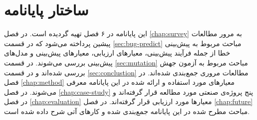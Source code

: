 \section{ساختار پایانامه}

این پایانامه در ۶ فصل تهیه گردیده است. در فصل \ref{chap:survey} به مرور مطالعات پیشین پرداخته می‌شود که در  قسمت \ref{sec:bug-predict}  مباحث مربوط به پیش‌بینی خطا از جمله فرآیند پیش‌بینی، معیارهای ارزیابی، معیارهای پیش‌بینی و مدل‌های پیش‌بینی بررسی می‌شوند. در قسمت \ref{sec:mutation} مباحث مربوط به آزمون جهش بررسی شده‌اند و در قسمت \ref{sec:conclustion} مطالعات مروری جمع‌بندی شده‌اند. در فصل \ref{chap:method} معیارهای مورد استفاده و ارائه شده در این پایانامه معرفی می‌شوند. در فصل \ref{chap:case-study} پنج پروژه‌ی صنعتی مورد مطالعه قرار گرفته‌اند و در فصل \ref{chap:evaluation} معیارها مورد ارزیابی قرار گرفته‌اند. در فصل \ref{chap:future} مباحث مطرح شده در این پایانامه جمع‌بندی شده و کارهای آتی شرح داده شده است. 
	
